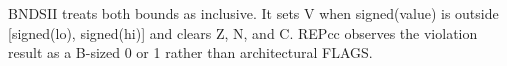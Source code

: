 BNDSII treats both bounds as inclusive. It sets V when signed(value) is outside [signed(lo), signed(hi)] and clears Z, N, and C. REPcc observes the violation result as a B-sized 0 or 1 rather than architectural FLAGS.
